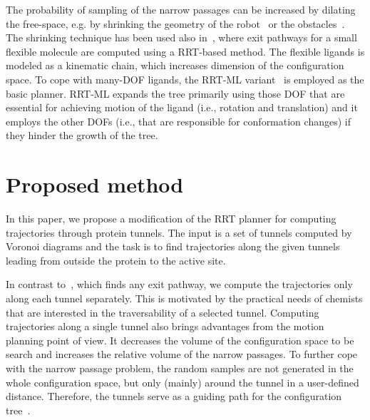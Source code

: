 \documentclass[usletter, 10pt, conference]{ieeeconf} %
\begin{document}
The probability of sampling of the narrow passages can be increased by dilating the free-space, e.g. by shrinking the geometry of 
the robot~\cite{hsuOnProb} or the obstacles~\cite{bayazitIRC}.
The shrinking technique has been used also in~\cite{cortes2010simulating}, where exit pathways for a small flexible molecule are
computed using a RRT-based method.
The flexible ligands is modeled as a kinematic chain, which increases dimension of the configuration space.
To cope with many-DOF ligands, the RRT-ML variant~\cite{cortes2007mlrrt} is employed as the basic planner.
RRT-ML expands the tree primarily using those DOF that are essential for achieving motion of the ligand (i.e., rotation
and translation) and it employs the other DOFs (i.e., that are responsible for conformation changes) if they hinder the growth of the tree.




\section{Proposed method}


In this paper, we propose a modification of the RRT planner for computing trajectories through protein tunnels.
The input is a set of tunnels computed by Voronoi diagrams and the task is to find trajectories along the given tunnels
leading from outside the protein to the active site.

In contrast to~\cite{cortes2010simulating}, which finds any exit pathway, we compute the trajectories only along each tunnel separately.
This is motivated by the practical needs of chemists that are interested in the traversability of a selected tunnel.
Computing trajectories along a single tunnel also brings advantages from the motion planning point of view.
It decreases the volume of the configuration space to be search and increases the relative volume of the narrow passages.
To further cope with the narrow passage problem, the random samples are not generated in the whole configuration space, but only (mainly) around
the tunnel in a user-defined distance.
Therefore, the tunnels serve as a guiding path for the configuration tree~\cite{vonasek2009rrt}.
\end{document}
